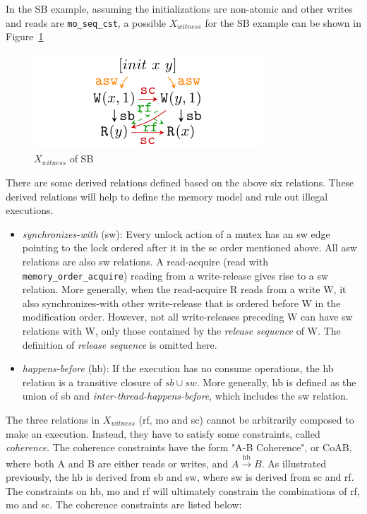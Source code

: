 In the SB example, assuming the initializations are non-atomic and other writes and reads are \texttt{mo\_seq\_cst}, a possible $X_{witness}$ for the SB example can be shown in Figure~\ref{XwitnessSB}

\begin{figure}[htbp] %
	\centering
	\includegraphics[scale=1.3]{figure/exec-graph/SB2.pdf} %
	\caption{$X_{witness}$ of SB} %
	\label{XwitnessSB} %
\end{figure}

There are some derived relations defined based on the above six relations. These derived relations will help to define the memory model and rule out illegal executions.

\begin{itemize}
	\item \textit{synchronizes-with} (sw): Every unlock action of a mutex has an sw edge pointing to the lock ordered after it in the sc order mentioned above. All asw relations are also sw relations. A read-acquire (read with \texttt{memory\_order\_acquire}) reading from a write-release gives rise to a sw relation. More generally, when the read-acquire R reads from a write W, it also synchronizes-with other write-release that is ordered before W in the modification order. However, not all write-releases preceding W can have sw relations with W, only those contained by the \textit{release sequence} of W. The definition of \textit{release sequence} is omitted here.
	\item \textit{happens-before} (hb): If the execution has no consume operations, the hb relation is a transitive closure of $sb \cup sw$. More generally, hb is defined as the union of sb and \textit{inter-thread-happens-before}, which includes the sw relation.
\end{itemize}


The three relations in $X_{witness}$ (rf, mo and sc) cannot be arbitrarily composed to make an execution. Instead, they have to satisfy some constraints, called \textit{coherence}. The coherence constraints have the form "A-B Coherence", or CoAB, where both A and B are either reads or writes, and $A \xrightarrow{\text{hb}} B$. As illustrated previously, the hb is derived from sb and sw, where sw is derived from sc and rf. The constraints on hb, mo and rf will ultimately constrain the combinations of rf, mo and sc. The coherence constraints are listed below:

